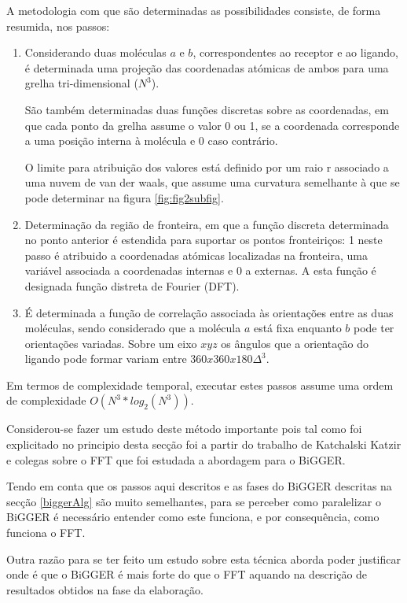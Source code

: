  A metodologia com que são determinadas as possibilidades consiste, de forma resumida, nos passos:
\begin{enumerate}
	\item Considerando duas moléculas $a$ e $b$, correspondentes  ao receptor e ao ligando, é determinada uma projeção das coordenadas atómicas de ambos para uma grelha tri-dimensional ($N^{3}$). 
	
	São também determinadas  duas funções discretas sobre as coordenadas, em que cada ponto da grelha assume o valor 0 ou 1, se a coordenada corresponde a uma posição interna à molécula e 0 caso contrário. 
	
	O limite para atribuição dos valores está definido por um raio r associado a uma nuvem de van der waals, que assume uma curvatura semelhante à que se pode determinar na figura \ref{fig:fig2subfig}.
	
	\item Determinação da região de fronteira, em que a função discreta determinada no ponto anterior é estendida para suportar os pontos fronteiriços: 1 neste passo é atribuido a coordenadas atómicas localizadas na fronteira, uma variável associada a coordenadas internas e 0 a externas. A esta função é designada função distreta de Fourier (DFT).
	
	\item É determinada a função de correlação associada às orientações entre as duas moléculas, sendo considerado que a molécula $a$ está fixa enquanto $b$ pode ter orientações variadas. Sobre um eixo $xyz$ os ângulos que a orientação do ligando pode formar variam entre $360x360x180\Delta^{3}$.

\end{enumerate} 
Em termos de complexidade temporal, executar estes passos assume uma ordem de complexidade $O(N^{3}*log_2(N^{3}))$\cite{teseProf}.

Considerou-se fazer um estudo deste método importante pois tal como foi explicitado no principio desta secção foi a partir do trabalho de Katchalski Katzir e colegas sobre o FFT que foi estudada a abordagem para o BiGGER\cite{teseProf}. 

Tendo em conta que os passos aqui descritos e as fases do BiGGER descritas na secção \ref{biggerAlg} são muito semelhantes, para se perceber como paralelizar o BiGGER é necessário entender como este funciona, e por consequência, como funciona o FFT. 

Outra razão para se ter feito um estudo sobre esta técnica aborda poder justificar onde é que o BiGGER é mais forte do que o FFT aquando na descrição de resultados obtidos na fase da elaboração.

